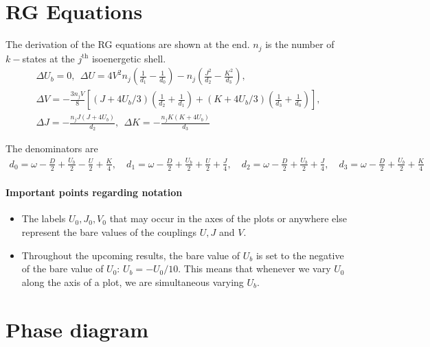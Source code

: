 \documentclass[10pt]{report}
\numberwithin{equation}{section}
\begin{document}
\section{RG Equations}
The derivation of the RG equations are shown at the end. \(n_j\) is the number of \(k-\)states at the \(j^\text{th}\) isoenergetic shell. 
\begin{gather}
	\Delta U_b = 0, ~ ~\Delta U = 4V^2 n_j\left(\frac{1}{d_1} - \frac{1}{d_0}\right) - n_j\left(\frac{J^2}{d_2} - \frac{K^2}{d_3}\right),\\
	\Delta V = -\frac{3n_j V}{8}\left[\left(J + 4U_b/3\right) \left(\frac{1}{d_2} + \frac{1}{d_1}\right) + \left(K + 4U_b/3\right)\left(\frac{1}{d_3} + \frac{1}{d_0}\right)\right],\\
	\Delta J = -\frac{n_j J\left(J + 4U_b\right)}{d_2},~ ~\Delta K = -\frac{n_j K\left(K + 4U_b\right)}{d_3}
\end{gather}

The denominators are
\begin{equation}\begin{aligned}
	d_0 = \omega - \frac{D}{2} + \frac{U_b}{2} - \frac{U}{2} + \frac{K}{4}, \quad d_1 = \omega - \frac{D}{2} + \frac{U_b}{2} + \frac{U}{2} + \frac{J}{4}, \quad d_2 = \omega - \frac{D}{2} + \frac{U_b}{2} + \frac{J}{4}, \quad d_3 = \omega - \frac{D}{2} + \frac{U_b}{2} + \frac{K}{4}
\end{aligned}\end{equation}

\paragraph{Important points regarding notation}
\begin{itemize}
	\item The labels \(U_0,J_0,V_0\) that may occur in the axes of the plots or anywhere else represent the bare values of the couplings \(U,J\) and \(V\). 
	\item Throughout the upcoming results, the bare value of \(U_b\) is set to the negative of the bare value of \(U_0\): \(U_b = -U_0/10\). This means that whenever we vary \(U_0\) along the axis of a plot, we are simultaneous varying \(U_b\).	
\end{itemize}

\section{Phase diagram}
\end{document}
